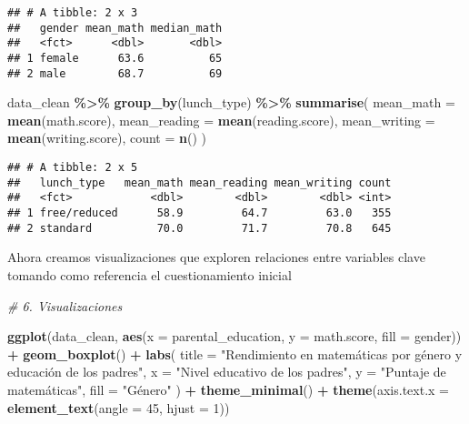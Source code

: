 \documentclass[
]{article}
\newenvironment{Shaded}{\begin{snugshade}}{\end{snugshade}}
\newcommand{\AttributeTok}[1]{\textcolor[rgb]{0.13,0.29,0.53}{#1}}
\newcommand{\CommentTok}[1]{\textcolor[rgb]{0.56,0.35,0.01}{\textit{#1}}}
\newcommand{\DecValTok}[1]{\textcolor[rgb]{0.00,0.00,0.81}{#1}}
\newcommand{\FunctionTok}[1]{\textcolor[rgb]{0.13,0.29,0.53}{\textbf{#1}}}
\newcommand{\NormalTok}[1]{#1}
\newcommand{\SpecialCharTok}[1]{\textcolor[rgb]{0.81,0.36,0.00}{\textbf{#1}}}
\newcommand{\StringTok}[1]{\textcolor[rgb]{0.31,0.60,0.02}{#1}}
\begin{document}
\begin{verbatim}
## # A tibble: 2 x 3
##   gender mean_math median_math
##   <fct>      <dbl>       <dbl>
## 1 female      63.6          65
## 2 male        68.7          69
\end{verbatim}

\begin{Shaded}
\begin{Highlighting}[]
\NormalTok{data\_clean }\SpecialCharTok{\%\textgreater{}\%}
  \FunctionTok{group\_by}\NormalTok{(lunch\_type) }\SpecialCharTok{\%\textgreater{}\%}
  \FunctionTok{summarise}\NormalTok{(}
    \AttributeTok{mean\_math =} \FunctionTok{mean}\NormalTok{(math.score),}
    \AttributeTok{mean\_reading =} \FunctionTok{mean}\NormalTok{(reading.score),}
    \AttributeTok{mean\_writing =} \FunctionTok{mean}\NormalTok{(writing.score),}
    \AttributeTok{count =} \FunctionTok{n}\NormalTok{()}
\NormalTok{  )}
\end{Highlighting}
\end{Shaded}

\begin{verbatim}
## # A tibble: 2 x 5
##   lunch_type   mean_math mean_reading mean_writing count
##   <fct>            <dbl>        <dbl>        <dbl> <int>
## 1 free/reduced      58.9         64.7         63.0   355
## 2 standard          70.0         71.7         70.8   645
\end{verbatim}

Ahora creamos visualizaciones que exploren relaciones entre variables
clave tomando como referencia el cuestionamiento inicial

\begin{Shaded}
\begin{Highlighting}[]
\CommentTok{\# 6. Visualizaciones}

\FunctionTok{ggplot}\NormalTok{(data\_clean, }\FunctionTok{aes}\NormalTok{(}\AttributeTok{x =}\NormalTok{ parental\_education, }\AttributeTok{y =}\NormalTok{ math.score, }\AttributeTok{fill =}\NormalTok{ gender)) }\SpecialCharTok{+}
  \FunctionTok{geom\_boxplot}\NormalTok{() }\SpecialCharTok{+}
  \FunctionTok{labs}\NormalTok{(}
    \AttributeTok{title =} \StringTok{"Rendimiento en matemáticas por género y educación de los padres"}\NormalTok{,}
    \AttributeTok{x =} \StringTok{"Nivel educativo de los padres"}\NormalTok{,}
    \AttributeTok{y =} \StringTok{"Puntaje de matemáticas"}\NormalTok{,}
    \AttributeTok{fill =} \StringTok{"Género"}
\NormalTok{  ) }\SpecialCharTok{+}
  \FunctionTok{theme\_minimal}\NormalTok{() }\SpecialCharTok{+}
  \FunctionTok{theme}\NormalTok{(}\AttributeTok{axis.text.x =} \FunctionTok{element\_text}\NormalTok{(}\AttributeTok{angle =} \DecValTok{45}\NormalTok{, }\AttributeTok{hjust =} \DecValTok{1}\NormalTok{))}
\end{Highlighting}
\end{Shaded}
\end{document}
